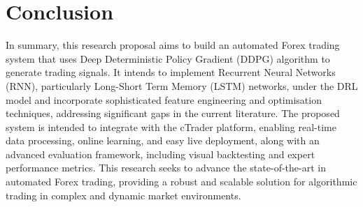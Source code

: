\section{Conclusion}

In summary, this research proposal aims to build an automated Forex trading system that uses Deep Deterministic Policy Gradient (DDPG) algorithm to generate trading signals. It intends to implement Recurrent Neural Networks (RNN), particularly Long-Short Term Memory (LSTM) networks, under the DRL model and incorporate sophisticated feature engineering and optimisation techniques, addressing significant gaps in the current literature. The proposed system is intended to integrate with the cTrader platform, enabling real-time data processing, online learning, and easy live deployment, along with an advanced evaluation framework, including visual backtesting and expert performance metrics. This research seeks to advance the state-of-the-art in automated Forex trading, providing a robust and scalable solution for algorithmic trading in complex and dynamic market environments.